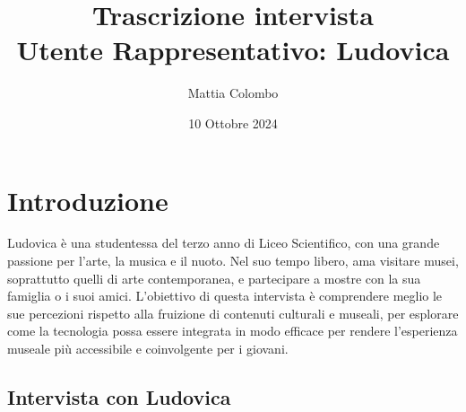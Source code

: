 \documentclass{article}
\title{\textbf{Trascrizione intervista}\\ Utente Rappresentativo: Ludovica}
\author{Mattia Colombo}
\date{10 Ottobre 2024}
\begin{document}
\maketitle

\section{Introduzione}
Ludovica è una studentessa del terzo anno di Liceo Scientifico, con una grande passione per l'arte, la musica e il nuoto. Nel suo tempo libero, ama visitare musei, soprattutto quelli di arte contemporanea, e partecipare a mostre con la sua famiglia o i suoi amici. L’obiettivo di questa intervista è comprendere meglio le sue percezioni rispetto alla fruizione di contenuti culturali e museali, per esplorare come la tecnologia possa essere integrata in modo efficace per rendere l’esperienza museale più accessibile e coinvolgente per i giovani.

\subsection{\textcolor{subsectioncolor}{Intervista con Ludovica}}
\end{document}
